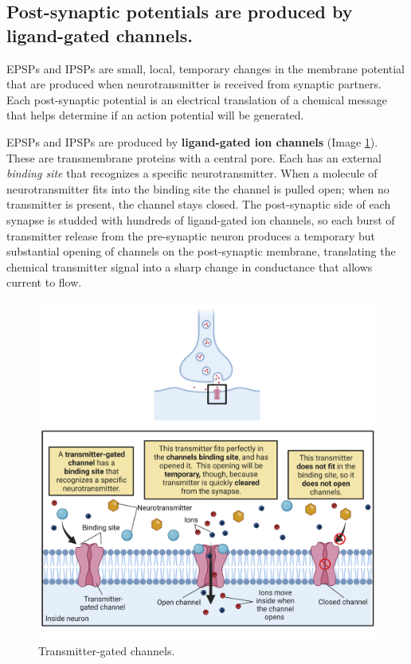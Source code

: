 \documentclass[
]{book}
\begin{document}
\hypertarget{post-synaptic-potentials-are-produced-by-ligand-gated-channels.}{%
\subsection{Post-synaptic potentials are produced by ligand-gated channels.}\label{post-synaptic-potentials-are-produced-by-ligand-gated-channels.}}

EPSPs and IPSPs are small, local, temporary changes in the membrane potential that are produced when neurotransmitter is received from synaptic partners. Each post-synaptic potential is an electrical translation of a chemical message that helps determine if an action potential will be generated.

EPSPs and IPSPs are produced by \textbf{ligand-gated ion channels }(Image \ref{fig:transmitter-gated-channels}). These are transmembrane proteins with a central pore. Each has an external \emph{binding site} that recognizes a specific neurotransmitter. When a molecule of neurotransmitter fits into the binding site the channel is pulled open; when no transmitter is present, the channel stays closed. The post-synaptic side of each synapse is studded with hundreds of ligand-gated ion channels, so each burst of transmitter release from the pre-synaptic neuron produces a temporary but substantial opening of channels on the post-synaptic membrane, translating the chemical transmitter signal into a sharp change in conductance that allows current to flow.

\begin{figure}

{\centering \includegraphics[width=0.9\linewidth]{images/ch02/02_21} 

}

\caption{Transmitter-gated channels.}\label{fig:transmitter-gated-channels}
\end{figure}
\end{document}
